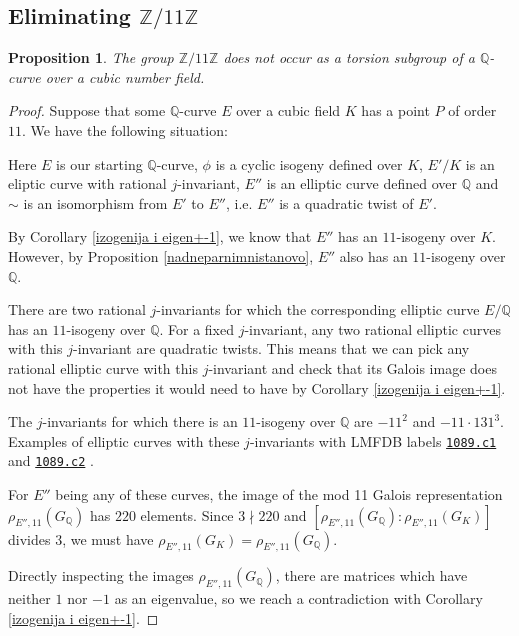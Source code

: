 \documentclass[10pt,leqno]{amsart}
\newcommand{\lmfdb}[1]{%
  \href{https://www.lmfdb.org/EllipticCurve/Q/#1}{\texttt{#1}}%
}
\newcommand{\Z}{\mathbb{Z}}
\newcommand{\Q}{\mathbb{Q}}
\newtheorem{proposition}[theorem]{Proposition}
\theoremstyle{definition}
\theoremstyle{remark}
\numberwithin{theorem}{section}
\begin{document}
\subsection{Eliminating $\Z/11\Z$} 
\begin{proposition}\label{eliminiraj11}
    The group $\Z/11\Z$ does not occur as a torsion subgroup of a $\Q$-curve over a cubic number field.
\end{proposition}
\begin{proof}
Suppose that some $\Q$-curve $E$ over a cubic field $K$ has a point $P$ of order $11$.
We have the following situation: 
\begin{center}
\end{center}
Here $E$ is our starting $\Q$-curve, $\phi$ is a cyclic isogeny defined over $K$, $E'/K$ is an eliptic curve with rational $j$-invariant, $E''$ is an elliptic curve defined over $\Q$ and $\sim$ is an isomorphism from $E'$ to $E''$, i.e. $E''$ is a quadratic twist of $E'$. 

By Corollary \ref{izogenija i eigen+-1}, we know that $E''$ has an $11$-isogeny over $K$. However, by Proposition \ref{nadneparnimnistanovo}, $E''$ also has an $11$-isogeny over $\Q$. 

There are two rational $j$-invariants for which the corresponding elliptic curve $E/\Q$ has an $11$-isogeny over $\Q$. For a fixed $j$-invariant, any two rational elliptic curves with this $j$-invariant are quadratic twists. This means that we can pick any rational elliptic curve with this $j$-invariant and check that its Galois image does not have the properties it would need to have by Corollary \ref{izogenija i eigen+-1}. 

The $j$-invariants for which there is an $11$-isogeny over $\Q$ are $-11^2$ and $-11\cdot 131^3$. Examples of elliptic curves with these $j$-invariants with LMFDB labels  \lmfdb{1089.c1} and \lmfdb{1089.c2}.

For $E''$ being any of these curves, the image of the mod 11 Galois representation $\rho_{E'', 11}(G_\Q)$ has $220$ elements. Since $3 \nmid 220$ and $[\rho_{E'',11}(G_\Q):\rho_{E'',11}(G_K)]$ divides $3$, we must have $\rho_{E'', 11}(G_K)=\rho_{E'', 11}(G_\Q)$. 

Directly inspecting the images $\rho_{E'', 11}(G_\Q)$, there are matrices which have neither $1$ nor $-1$ as an eigenvalue, so we reach a contradiction with Corollary \ref{izogenija i eigen+-1}. 
\end{proof}
\end{document}
